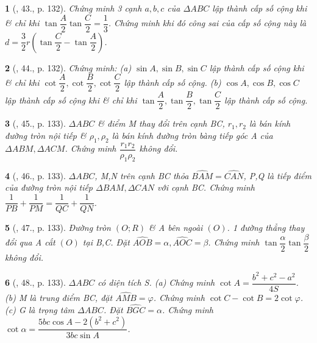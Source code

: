 \documentclass{article}
\newtheorem{baitoan}{}
\begin{document}
\begin{baitoan}[\cite{TLCT_hinh_hoc_10}, 43., p. 132]
	Chứng minh 3 cạnh $a,b,c$ của $\Delta ABC$ lập thành cấp số cộng khi \& chỉ khi $\tan\dfrac{A}{2}\tan\dfrac{C}{2} = \dfrac{1}{3}$. Chứng minh khi đó công sai của cấp số cộng này là $d = \dfrac{3}{2}r\left(\tan\dfrac{C}{2} - \tan\dfrac{A}{2}\right)$.
\end{baitoan}

\begin{baitoan}[\cite{TLCT_hinh_hoc_10}, 44., p. 132]
	Chứng minh: (a) $\sin A,\sin B,\sin C$ lập thành cấp số cộng khi \& chỉ khi $\cot\dfrac{A}{2},\cot\dfrac{B}{2},\cot\dfrac{C}{2}$ lập thành cấp số cộng. (b) $\cos A,\cos B,\cos C$ lập thành cấp số cộng khi \& chỉ khi $\tan\dfrac{A}{2},\tan\dfrac{B}{2},\tan\dfrac{C}{2}$ lập thành cấp số cộng.
\end{baitoan}

\begin{baitoan}[\cite{TLCT_hinh_hoc_10}, 45., p. 133]
	$\Delta ABC$ \& điểm M thay đổi trên cạnh BC, $r_1,r_2$ là bán kính đường tròn nội tiếp \& $\rho_1,\rho_2$ là bán kính đường tròn bàng tiếp góc A của $\Delta ABM,\Delta ACM$. Chứng minh $\dfrac{r_1r_2}{\rho_1\rho_2}$ không đổi.
\end{baitoan}

\begin{baitoan}[\cite{TLCT_hinh_hoc_10}, 46., p. 133]
	$\Delta ABC$, M,N trên cạnh BC thỏa $\widehat{BAM} = \widehat{CAN}$, P,Q là tiếp điểm của đường tròn nội tiếp $\Delta BAM,\Delta CAN$ với cạnh BC. Chứng minh $\dfrac{1}{PB} + \dfrac{1}{PM} = \dfrac{1}{QC} + \dfrac{1}{QN}$.
\end{baitoan}

\begin{baitoan}[\cite{TLCT_hinh_hoc_10}, 47., p. 133]
	Đường tròn $(O;R)$ \& A bên ngoài $(O)$. 1 đường thẳng thay đổi qua A cắt $(O)$ tại B,C. Đặt $\widehat{AOB} = \alpha,\widehat{AOC} = \beta$. Chứng minh $\tan\dfrac{\alpha}{2}\tan\dfrac{\beta}{2}$ không đổi.
\end{baitoan}

\begin{baitoan}[\cite{TLCT_hinh_hoc_10}, 48., p. 133]
	$\Delta ABC$ có diện tích S. (a) Chứng minh $\cot A = \dfrac{b^2 + c^2 - a^2}{4S}$. (b) M là trung điểm BC, đặt $\widehat{AMB} = \varphi$. Chứng minh $\cot C - \cot B = 2\cot\varphi$. (c) G là trọng tâm $\Delta ABC$. Đặt $\widehat{BGC} = \alpha$. Chứng minh $\cot\alpha = \dfrac{5bc\cos A - 2(b^2 + c^2)}{3bc\sin A}$.
\end{baitoan}
\end{document}
